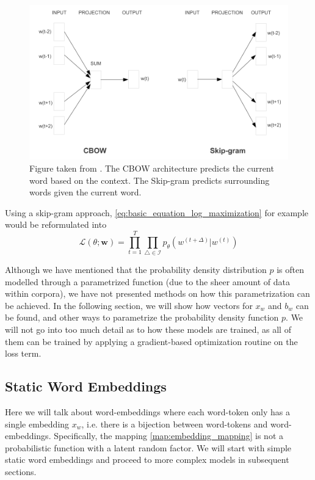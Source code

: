 \documentclass[a4paper,12pt,oneside,openright]{report}
\begin{document}
\begin{figure}[h]
	\center
  \includegraphics[width=0.6\linewidth]{./assets/background/cbow_and_skipgram.png}
  \caption{Figure taken from \cite{mikolov13}. The CBOW architecture predicts the current word based on the context. The Skip-gram predicts surrounding words given the current word.}
  \label{fig:cbow_skipgram}
\end{figure}

Using a skip-gram approach, \eqref{eq:basic_equation_log_maximization} for example would be reformulated into 
\begin{equation}
\mathcal{L}(\theta ; \mathbf{w})=\prod_{t=1}^{T} \prod_{\triangle \in \mathcal{I}} p_{\theta}\left(w^{(t +\Delta)} | w^{(t)}\right)
\end{equation}{\label{eq:basic_equation_log_maximization_skipgram}}

Although we have mentioned that the probability density distribution $p$ is often modelled through a parametrized function (due to the sheer amount of data within corpora), we have not presented methods on how this parametrization can be achieved.
In the following section, we will show how vectors for $x_w$ and $b_w$ can be found, and other ways to parametrize the probability density function $p$.
We will not go into too much detail as to how these models are trained, as all of them can be trained by applying a gradient-based optimization routine on the loss term.

\subsection{Static Word Embeddings}

Here we will talk about word-embeddings where each word-token only has a single embedding $x_w$, i.e. there is a bijection between word-tokens and word-embeddings. 
Specifically, the mapping \eqref{map:embedding_mapping} is not a probabilistic function with a latent random factor.
We will start with simple static word embeddings and proceed to more complex models in subsequent sections.
\end{document}
